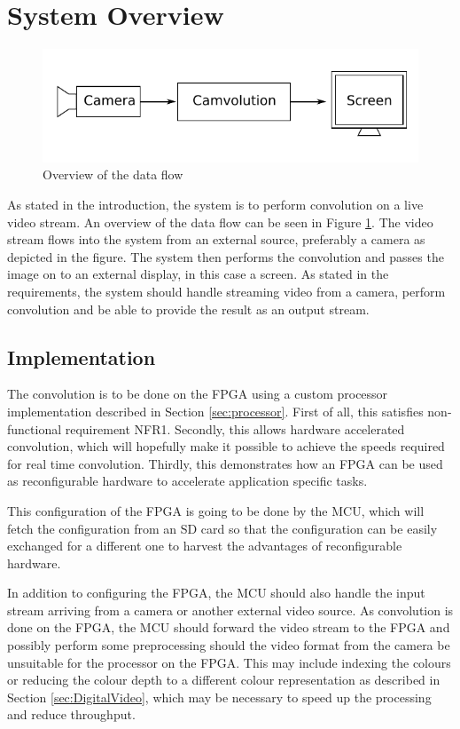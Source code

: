 \section{System Overview}


\begin{figure}[h]
    \centering
    \includegraphics{img/SystemOverview.pdf}
    \caption{Overview of the data flow}
    \label{fig:SystemOverview}
\end{figure}

As stated in the introduction, the system is to perform convolution on a live video stream.
An overview of the data flow can be seen in Figure \ref{fig:SystemOverview}.
The video stream flows into the system from an external source, preferably a camera as depicted in the figure.
The system then performs the convolution and passes the image on to an external display, in this case a screen.
As stated in the requirements, the system should handle streaming video from a camera, perform convolution and be able to provide the result as an output stream.

\subsection{Implementation}
The convolution is to be done on the FPGA using a custom processor implementation described in Section \ref{sec:processor}.
First of all, this satisfies non-functional requirement NFR1.
Secondly, this allows hardware accelerated convolution, which will hopefully make it possible to achieve the speeds required for real time convolution.
Thirdly, this demonstrates how an FPGA can be used as reconfigurable hardware to accelerate application specific tasks.

This configuration of the FPGA is going to be done by the MCU, which will fetch the configuration from an SD card so that the configuration can be easily exchanged for a different one to harvest the advantages of reconfigurable hardware.

In addition to configuring the FPGA, the MCU should also handle the input stream arriving from a camera or another external video source.
As convolution is done on the FPGA, the MCU should forward the video stream to the FPGA and possibly perform some preprocessing should the video format from the camera be unsuitable for the processor on the FPGA.
This may include indexing the colours or reducing the colour depth to a different colour representation as described in Section \ref{sec:DigitalVideo}, which may be necessary to speed up the processing and reduce throughput.

